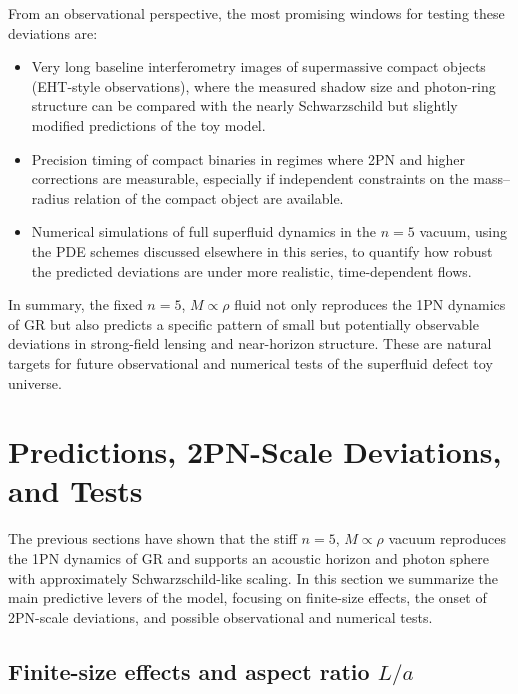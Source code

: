 \documentclass[11pt]{article}
\begin{document}
From an observational perspective, the most promising windows for testing
these deviations are:
\begin{itemize}
  \item Very long baseline interferometry images of supermassive compact
        objects (EHT-style observations), where the measured shadow size and
        photon-ring structure can be compared with the nearly Schwarzschild
        but slightly modified predictions of the toy model.
  \item Precision timing of compact binaries in regimes where 2PN and higher
        corrections are measurable, especially if independent constraints on
        the mass--radius relation of the compact object are available.
  \item Numerical simulations of full superfluid dynamics in the \(n=5\)
        vacuum, using the PDE schemes discussed elsewhere in this series, to
        quantify how robust the predicted deviations are under more
        realistic, time-dependent flows.
\end{itemize}

In summary, the fixed \(n=5\), \(M \propto \rho\) fluid not only reproduces
the 1PN dynamics of GR but also predicts a specific pattern of small but
potentially observable deviations in strong-field lensing and near-horizon
structure.  These are natural targets for future observational and
numerical tests of the superfluid defect toy universe.

\section{Predictions, 2PN-Scale Deviations, and Tests}
\label{sec:predictions}

The previous sections have shown that the stiff \(n=5\), \(M \propto \rho\)
vacuum reproduces the 1PN dynamics of GR and supports an acoustic horizon
and photon sphere with approximately Schwarzschild-like scaling.  In this
section we summarize the main predictive levers of the model, focusing on
finite-size effects, the onset of 2PN-scale deviations, and possible
observational and numerical tests.

\subsection{Finite-size effects and aspect ratio \texorpdfstring{$L/a$}{L/a}}
\label{subsec:predictions-La}
\end{document}
